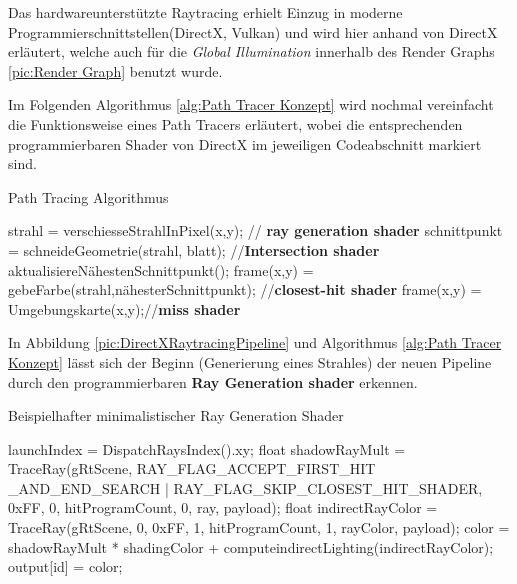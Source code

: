 Das hardwareunterstützte Raytracing erhielt Einzug in moderne Programmierschnittstellen(DirectX, Vulkan) und wird 
hier anhand von DirectX erläutert, welche auch für die \textit{Global Illumination} innerhalb des 
Render Graphs \ref{pic:Render Graph} benutzt wurde. 

Im Folgenden Algorithmus \ref{alg:Path Tracer Konzept} wird nochmal vereinfacht die Funktionsweise 
eines Path Tracers erläutert, wobei die entsprechenden programmierbaren Shader von DirectX 
im jeweiligen Codeabschnitt markiert sind.

\begin{algorithm}[H]
    \caption{Path Tracing Algorithmus}
    \begin{algorithmic}[1]
        \State strahl = verschiesseStrahlInPixel(x,y); // \textbf{ray generation shader}
        \State schnittpunkt = schneideGeometrie(strahl, blatt); //\textbf{Intersection shader}
        \State aktualisiereNähestenSchnittpunkt();
        \EndIf
        \EndFor
        \State frame(x,y) = gebeFarbe(strahl,nähesterSchnittpunkt); //\textbf{closest-hit shader}
        \Else
        \State frame(x,y) = Umgebungskarte(x,y);//\textbf{miss shader}
        \EndIf
        \EndFor
        \EndProcedure
    \end{algorithmic}
    \label{alg:Path Tracer Konzept}
\end{algorithm}


In Abbildung \ref{pic:DirectXRaytracingPipeline} und  Algorithmus \ref{alg:Path Tracer Konzept} lässt sich
der Beginn (Generierung eines Strahles) der neuen Pipeline durch den programmierbaren
\textbf{Ray Generation shader} erkennen.

\begin{algorithm}[H]
    \caption{Beispielhafter minimalistischer Ray Generation Shader}
    \begin{algorithmic}[1]
        \State launchIndex = DispatchRaysIndex().xy;
            \State float shadowRayMult = TraceRay(gRtScene,
            RAY\_FLAG\_ACCEPT\_FIRST\_HIT \_AND\_END\_SEARCH |
            RAY\_FLAG\_SKIP\_CLOSEST\_HIT\_SHADER,
            0xFF, 0, hitProgramCount, 0, ray, payload);
            \State float indirectRayColor = TraceRay(gRtScene, 0, 0xFF, 1, hitProgramCount, 1, rayColor, payload);
            \State color = shadowRayMult * shadingColor + computeindirectLighting(indirectRayColor);
        \EndFor
        \State output[id] = color;
    \end{algorithmic}
    \label{alg:Ray Gen}
\end{algorithm}

